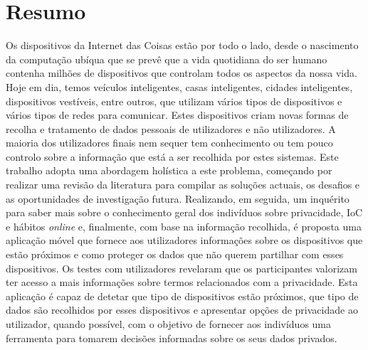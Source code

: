 %
%
\chapter*{Resumo}
\justify

Os dispositivos da Internet das Coisas estão por todo o lado, desde
o nascimento da computação ubíqua que se prevê que a vida quotidiana
do ser humano contenha milhões de dispositivos que controlam todos os
aspectos da nossa vida. Hoje em dia, temos veículos inteligentes, casas
inteligentes, cidades inteligentes, dispositivos vestíveis, entre
outros, que utilizam vários tipos de dispositivos e vários tipos de
redes para comunicar. Estes dispositivos criam novas formas de recolha
e tratamento de dados pessoais de utilizadores e não utilizadores.
A maioria dos utilizadores finais nem sequer tem conhecimento ou tem
pouco controlo sobre a informação que está a ser recolhida por
estes sistemas. Este trabalho adopta uma abordagem holística a este
problema, começando por realizar uma revisão da literatura para
compilar as soluções actuais, os desafios e as oportunidades de
investigação futura. Realizando, em seguida, um inquérito para saber mais
sobre o conhecimento geral dos indivíduos sobre privacidade, IoC e
hábitos \textit{online} e, finalmente, com base na informação recolhida,
é proposta uma aplicação móvel que fornece aos utilizadores informações
sobre os dispositivos que estão próximos e como proteger os dados
que não querem partilhar com esses dispositivos.
Os testes com utilizadores revelaram que os participantes valorizam
ter acesso a mais informações sobre termos relacionados com a privacidade.
Esta aplicação é capaz de detetar que tipo de dispositivos estão próximos,
que tipo de dados são recolhidos por esses dispositivos
e apresentar opções de privacidade ao utilizador, quando possível,
com o objetivo de fornecer aos indivíduos uma ferramenta para tomarem
decisões informadas sobre os seus dados privados.


